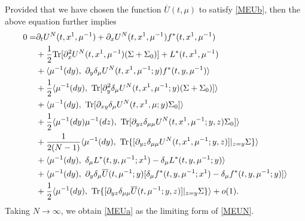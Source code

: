 \documentclass{amsart}
\theoremstyle{definition}
\theoremstyle{remark}
\numberwithin{equation}{section}
\begin{document}
Provided that we have chosen the function $\overline U(t,\mu)$ to satisfy \eqref{MEUb},
then the above equation further implies
{\allowdisplaybreaks
\begin{align}
 0=&\partial_t U^N(t, x^1, \mu^{-1})  + \partial_x U^N(t,x^1, \mu^{-1})f^*(t, x^1, \mu^{-1}) \label{MEUN}  \\
& + \frac12 \mbox{Tr}[ \partial_x^2 U^N(t, x^1, \mu^{-1}) (\Sigma+\Sigma_0)] + L^*(t,x^1, \mu^{-1}) \notag \\
&+  \langle  \mu^{-1}(dy), \  \partial_y \delta_\mu U^N(t, x^1, \mu^{-1}; y)
f^*(t,y, \mu^{-1})    \rangle \notag  \\
&  +\frac12  \langle\mu^{-1}(dy) ,\    \mbox{Tr} [\partial_y^2 \delta_\mu U^N(t, x^1, \mu^{-1}; y) (\Sigma+\Sigma_0)]  \rangle \notag \\
&+\langle \mu^{-1}(dy),\ \mbox{Tr} [\partial_{xy}\delta_\mu U^N(t,x^1, \mu; y)\Sigma_0 ]\rangle \notag \\
& + \frac12\langle\mu^{-1}(dy) \mu^{-1}(dz), \    \mbox{Tr[}\partial_{yz} \delta_{\mu\mu} U^N(t, x^1, \mu^{-1};y,z) \Sigma_0  ]\rangle \notag  \\
&  +  \frac{1}{2(N-1)}\langle\mu^{-1}(dy) , \    \mbox{Tr}\{[\partial_{yz} \delta_{\mu\mu} U^N(t, x^1, \mu^{-1};y,z)]|_{z=y} \Sigma \} \rangle\notag  \\
 &+\langle\mu^{-1}(dy), \    \delta_\mu L^*( t, y, \mu^{-1};x^1)  -  \delta_\mu L^*( t, y, \mu^{-1};y)    \rangle \notag  \\
&+ \langle \mu^{-1}(dy),\   \partial_y\delta_\mu \overline U(t, \mu^{-1}; y)[  \delta_\mu f^*(t, y, \mu^{-1}; x^1)- \delta_\mu f^*(t, y, \mu^{-1}; y) ]  \rangle  \notag \\
& +  \frac12\langle\mu^{-1}(dy) , \    \mbox{Tr}\{[\partial_{yz} \delta_{\mu\mu} \overline U(t, \mu^{-1};y,z)]|_{z=y} \Sigma \} \rangle +o(1)  . \notag
\end{align}
}
Taking $N\to \infty$, we obtain  \eqref{MEUa} as the limiting form of \eqref{MEUN}.
\end{document}

